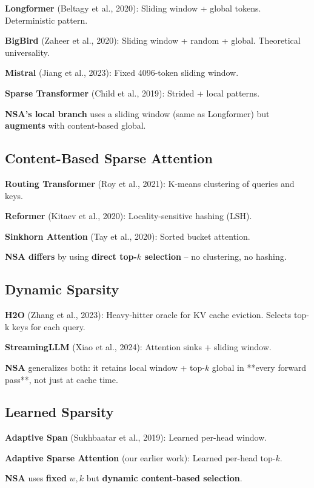 \textbf{Longformer} (Beltagy et al., 2020): Sliding window + global tokens. 
Deterministic pattern.

\textbf{BigBird} (Zaheer et al., 2020): Sliding window + random + global. 
Theoretical universality.

\textbf{Mistral} (Jiang et al., 2023): Fixed 4096-token sliding window.

\textbf{Sparse Transformer} (Child et al., 2019): Strided + local patterns.

\textbf{NSA's local branch} uses a sliding window (same as Longformer) but 
\textbf{augments} with content-based global.

\subsection{Content-Based Sparse Attention}

\textbf{Routing Transformer} (Roy et al., 2021): K-means clustering of queries 
and keys.

\textbf{Reformer} (Kitaev et al., 2020): Locality-sensitive hashing (LSH).

\textbf{Sinkhorn Attention} (Tay et al., 2020): Sorted bucket attention.

\textbf{NSA differs} by using \textbf{direct top-$k$ selection} -- no clustering, no 
hashing.

\subsection{Dynamic Sparsity}

\textbf{H2O} (Zhang et al., 2023): Heavy-hitter oracle for KV cache eviction. 
Selects top-k keys for each query.

\textbf{StreamingLLM} (Xiao et al., 2024): Attention sinks + sliding window.

\textbf{NSA} generalizes both: it retains local window + top-$k$ global in **every 
forward pass**, not just at cache time.

\subsection{Learned Sparsity}

\textbf{Adaptive Span} (Sukhbaatar et al., 2019): Learned per-head window.

\textbf{Adaptive Sparse Attention} (our earlier work): Learned per-head top-$k$.

\textbf{NSA} uses \textbf{fixed} $w, k$ but \textbf{dynamic content-based selection}.

